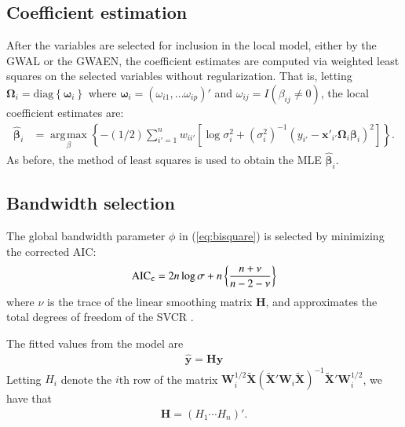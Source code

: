 \documentclass[authoryear, review, 11pt]{elsarticle}
\DeclareMathOperator*{\argmax}{\arg\!\max}
\begin{document}
	\subsection{Coefficient estimation}
	After the variables are selected for inclusion in the local model, either by the GWAL or the GWAEN, the coefficient estimates are computed via weighted least squares on the selected variables without regularization. That is, letting $\bm{\Omega}_i = \text{diag}\left\{\bm{\omega}_i\right\}$ where $\bm{\omega}_i = \left(\omega_{i1}, \dots \omega_{ip}\right)'$ and $\omega_{ij}= I \left(\beta_{ij} \neq 0\right)$, the local coefficient estimates are:
	\begin{align} \label{eq:coefficients}
		\hat{\bm{\beta}}_i &= \argmax \limits_{\beta} \left\{-(1/2) \sum_{i'=1}^n w_{ii'} \left[ \log{\sigma^2_i}  + \left(\sigma^2_i\right)^{-1}  \left(y_{i'} - \bm{x}'_{i'} \bm{\Omega}_i \bm{\beta}_i \right)^2 \right]\right\}.
	\end{align}	
	As before, the method of least squares is used to obtain the MLE $\hat{\bm{\beta}}_i$.
	
	 
	\subsection{Bandwidth selection}
	The global bandwidth parameter $\phi$ in (\ref{eq:bisquare}) is selected by minimizing the corrected AIC:	
	\begin{align}
		\text{AIC}_{\tt c} = 2 n \log{\sigma} + n \left\{\frac{n + \nu}{n - 2 - \nu}\right\}
	\end{align}	
	where $\nu$ is the trace of the linear smoothing matrix $\bm{H}$, and approximates the total degrees of freedom of the SVCR \citep{Hurvich:1998}.

	The fitted values from the model are	
	\begin{align}
		\hat{\bm{y}} = \bm{H} \bm{y}
	\end{align}
	Letting $H_i$ denote the $i$th row of the matrix $\bm{W}_i^{1/2} \tilde{\bm{X}} \left( \tilde{\bm{X}}'\bm{W}_i \tilde{\bm{X}} \right)^{-1} \tilde{\bm{X}}'\bm{W}_i^{1/2}$, we have that	
	\begin{align}
		\bm{H} = \left(H_1 \cdots H_n \right)'.
	\end{align}	
		
\end{document}

